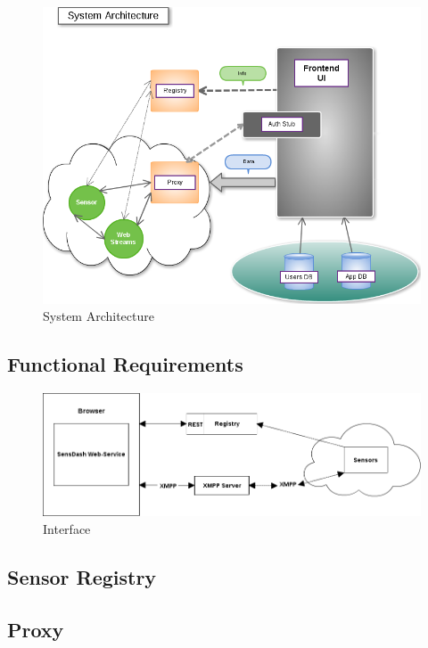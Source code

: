 \begin{figure}[!ht]
\centering
\includegraphics[scale=0.5]{images/Structure.png}   
\caption[System Architecture]{System Architecture}
\label{img:structure}                           
\end{figure}

\subsection{Functional Requirements}
\begin{figure}[!ht]
\centering
\includegraphics[scale=0.5]{images/Interface.png}   
\caption[Interface]{Interface}
\label{img:interfaces}                           
\end{figure}

\subsection{Sensor Registry}
\subsection{Proxy}
